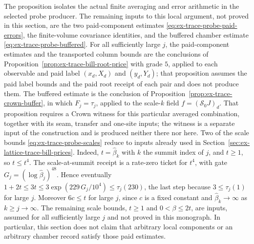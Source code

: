 The proposition isolates the actual finite averaging and error arithmetic
in the selected probe producer. The remaining inputs to this
local argument, not proved in this section, are the two paid-component estimates
\eqref{eq:ex-trace-probe-paid-errors}, the finite-volume covariance
identities, and the buffered chamber estimate
\eqref{eq:ex-trace-probe-buffered}. For all sufficiently large $j$, the
paid-component estimates and the transported column bounds are the
conclusions of Proposition~\ref{prop:ex-trace-bill-root-price} with
grade $5$, applied to each observable and paid label $(x_d,X_d)$ and
$(y_d,Y_d)$; that proposition assumes the paid label bounds and the paid
root receipt of each pair and does not produce them. The buffered estimate is the conclusion of
Proposition~\ref{prop:ex-trace-crown-buffer}, in which $F_j=\tau_j$,
applied to the scale-$k$ field $f=(\mathscr S_0J)_d$. That proposition
requires a Crown witness for this particular averaged combination,
together with its seam, transfer and one-site inputs; the witness is a
separate input of the construction and is produced neither there nor
here. Two of the scale bounds \eqref{eq:ex-trace-probe-scales} reduce
to inputs already used in Section~\ref{sec:ex-lattice-trace-bill-prices}.
Indeed, $t=\widehat\beta_k$ with $k$ the summit index of $j$, and $t\ge1$,
so $t\le t^4$. The scale-at-summit receipt is a rate-zero ticket for
$t^4$, with gate $G_j=(\log\widehat\beta_j)^{48}$. Hence eventually
$1+2t\le3t\le3\exp(229\,G_j/10^4)\le\tau_j(230)$, the last step because
$3\le\tau_j(1)$ for large $j$. Moreover $6c\le t$ for large $j$, since $c$
is a fixed constant and $\widehat\beta_k\to\infty$ as $k\ge j\to\infty$.
The remaining scale bounds, $t\ge1$ and $0<\beta\le2t$, are inputs,
assumed for all sufficiently large $j$ and not proved in this monograph.
In
particular, this section does not claim that arbitrary local components
or an arbitrary chamber record satisfy those paid estimates.
